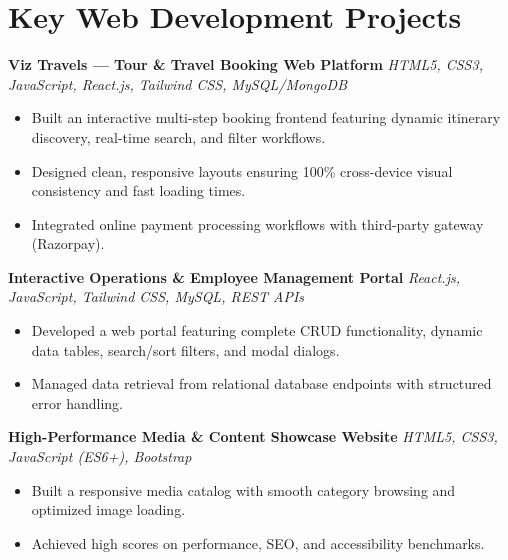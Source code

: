\documentclass[a4paper,10pt]{article}
\begin{document}
\section*{Key Web Development Projects}

\textbf{Viz Travels --- Tour & Travel Booking Web Platform}
\hfill
\textit{HTML5, CSS3, JavaScript, React.js, Tailwind CSS, MySQL/MongoDB}

\begin{itemize}

    \item Built an interactive multi-step booking frontend featuring dynamic itinerary discovery, real-time search, and filter workflows.

    \item Designed clean, responsive layouts ensuring 100\% cross-device visual consistency and fast loading times.

    \item Integrated online payment processing workflows with third-party gateway (Razorpay).

\end{itemize}


\textbf{Interactive Operations & Employee Management Portal}
\hfill
\textit{React.js, JavaScript, Tailwind CSS, MySQL, REST APIs}

\begin{itemize}

    \item Developed a web portal featuring complete CRUD functionality, dynamic data tables, search/sort filters, and modal dialogs.

    \item Managed data retrieval from relational database endpoints with structured error handling.

\end{itemize}


\textbf{High-Performance Media & Content Showcase Website}
\hfill
\textit{HTML5, CSS3, JavaScript (ES6+), Bootstrap}

\begin{itemize}

    \item Built a responsive media catalog with smooth category browsing and optimized image loading.

    \item Achieved high scores on performance, SEO, and accessibility benchmarks.

\end{itemize}
\end{document}
